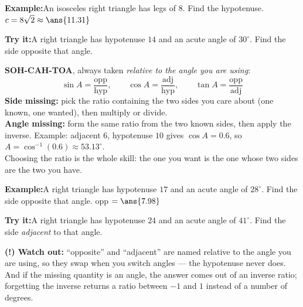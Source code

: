 \documentclass[12pt]{article}
\begin{document}
\begin{examplebox}
\textbf{Example:}\quad An isosceles right triangle has legs of $8$. Find the
hypotenuse.
$c = 8\sqrt{2} \approx \ans{11.31}$
\end{examplebox}

\begin{tryitbox}
\textbf{Try it:}\quad A right triangle has hypotenuse $14$ and an acute
angle of $30^\circ$. Find the side opposite that angle.\\[2pt]
\end{tryitbox}


\begin{formulabox}
\textbf{SOH-CAH-TOA}, always taken \emph{relative to the angle you are using}:
\[ \sin A = \frac{\text{opp}}{\text{hyp}}, \qquad
   \cos A = \frac{\text{adj}}{\text{hyp}}, \qquad
   \tan A = \frac{\text{opp}}{\text{adj}} \]
\textbf{Side missing:} pick the ratio containing the two sides you care about
(one known, one wanted), then multiply or divide.\\[3pt]
\textbf{Angle missing:} form the same ratio from the two known sides, then
apply the inverse. Example: adjacent $6$, hypotenuse $10$ gives
$\cos A = 0.6$, so $A = \cos^{-1}(0.6) \approx 53.13^\circ$.\\[3pt]
Choosing the ratio is the whole skill: the one you want is the one whose two
sides are the two you have.
\end{formulabox}

\begin{examplebox}
\textbf{Example:}\quad A right triangle has hypotenuse $17$ and an acute angle
of $28^\circ$. Find the side opposite that angle.
opp $= \ans{7.98}$
\end{examplebox}

\begin{tryitbox}
\textbf{Try it:}\quad A right triangle has hypotenuse $24$ and an acute angle
of $41^\circ$. Find the side \emph{adjacent} to that angle.\\[2pt]
\end{tryitbox}

\begin{watchoutbox}
\textbf{(!) Watch out:} ``opposite'' and ``adjacent'' are named relative to the
angle you are using, so they swap when you switch angles --- the hypotenuse
never does. And if the missing quantity is an angle, the answer comes out of an
inverse ratio; forgetting the inverse returns a ratio between $-1$ and $1$
instead of a number of degrees.
\end{watchoutbox}
\end{document}
